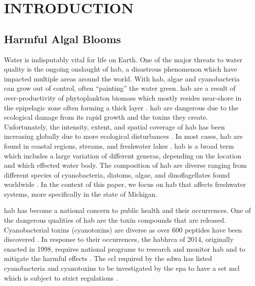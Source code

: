 
\chapter{INTRODUCTION}
\section{Harmful Algal Blooms}

Water is indisputably vital for life on Earth. One of the major threats to water quality is the ongoing onslaught of \gls{hab}, a disastrous phenomenon which have impacted multiple areas around the world. With \gls{hab}, algae and cyanobacteria can grow out of control, often ``painting'' the water green. \gls{hab} are a result of over-productivity of phytoplankton biomass which mostly resides near-shore in the epipelagic zone often forming a thick layer \cite{moore_richard_cyanobacterial_1993}.  \gls{hab} are dangerous due to the ecological damage from its rapid growth and the toxins they create. Unfortunately, the intensity, extent, and spatial coverage of \gls{hab} has been increasing globally due to more ecological disturbances \cite{codd_cyanobacterial_1999}. In most cases, \gls{hab} are found in coastal regions, streams, and freshwater lakes \cite{rastogi_cyanotoxin-microcystins:_2014}. \gls{hab} is a broad term which includes a large variation of different generas, depending on the location and which effected water body. The composition of \gls{hab} are diverse ranging from  different species of cyanobacteria, diatoms, algae, and dinoflagellates found worldwide \cite{dittmann_cyanobacterial_2012}. In the context of this paper, we focus on \gls{hab} that affects freshwater systems, more specifically in the state of Michigan.

\gls{hab} has become a national concern to public health and their occurrences. One of the dangerous qualities of \gls{hab} are the toxin compounds that are released. Cyanobacterial toxins (cyanotoxins) are diverse as over 600 peptides have been discovered \cite{welker_cyanobacterial_2006}. In response to their occurrences, the \gls{habhrca} of 2014, originally enacted in 1998, requires national programs to research and monitor \gls{hab} and to mitigate the harmful effects \cite{noauthor_harmful_2014}. The \gls{ccl} required by the \gls{sdwa} has listed cyanobacteria and cyanotoxins to be investigated by the \gls{epa} to have a set \gls{mcl} which is subject to strict regulations \cite{usepa_drinking_2016}. 

